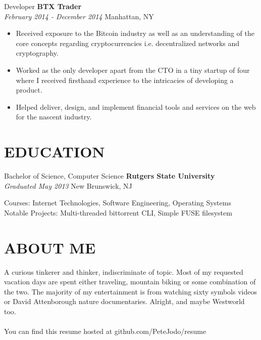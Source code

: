 \documentclass[margin]{res}
\begin{document}
\begin{resume}
	Developer \hfill \textbf{BTX Trader} \\
	\textsl{February 2014 - December 2014} \hfill Manhattan, NY

    \begin{itemize} \itemsep -2pt %
    \item Received exposure to the Bitcoin industry as well as an understanding of the core concepts regarding cryptocurrencies i.e. decentralized networks and cryptography.
    \item Worked as the only developer apart from the CTO in a tiny startup of four where I received firsthand experience to the intricacies of developing a product.
    \item Helped deliver, design, and implement financial tools and services on the web for the nascent industry.
    \end{itemize}

\section{EDUCATION}
    Bachelor of Science, Computer Science \hfill \textbf{Rutgers State University} \\
    \textsl{Graduated May 2013} \hfill New Brunswick, NJ

    Courses: {\small Internet Technologies, Software Engineering, Operating Systems} \\
    Notable Projects: {\small Multi-threaded bittorrent CLI, Simple FUSE filesystem}

\section{ABOUT ME}
    A curious tinkerer and thinker, indiscriminate of topic. Most of my requested vacation days are spent either traveling, mountain biking or some combination of the two. The majority of my entertainment is from watching sixty symbols videos or David Attenborough nature documentaries. Alright, and maybe Westworld too. \\
    \\
    {\small You can find this resume hosted at github.com/PeteJodo/resume}


\end{resume}
\end{document}
